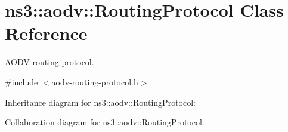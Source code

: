 \hypertarget{classns3_1_1aodv_1_1RoutingProtocol}{}\section{ns3\+:\+:aodv\+:\+:Routing\+Protocol Class Reference}
\label{classns3_1_1aodv_1_1RoutingProtocol}


A\+O\+DV routing protocol.  




{\ttfamily \#include $<$aodv-\/routing-\/protocol.\+h$>$}



Inheritance diagram for ns3\+:\+:aodv\+:\+:Routing\+Protocol\+:


Collaboration diagram for ns3\+:\+:aodv\+:\+:Routing\+Protocol\+:

